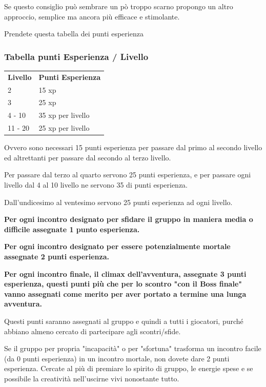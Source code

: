 \documentclass[a4paper,11pt,twoside,openany]{book}
\begin{document}
Se questo consiglio può sembrare un pò troppo scarno propongo un altro approccio, semplice ma ancora più efficace e stimolante.

Prendete questa tabella dei punti esperienza

\subsubsection{Tabella punti Esperienza / Livello}

\label{tabella-punti-esperienza-livello}

\begin{tabular}{ll}
	\toprule
	\textbf{Livello} & \textbf{Punti Esperienza}\tabularnewline
	2                & 15 xp\tabularnewline
	3                & 25 xp\tabularnewline
	4 - 10           & 35 xp per livello\tabularnewline
	11 - 20          & 25 xp per livello\tabularnewline
\end{tabular}

\bigskip

Ovvero sono necessari 15 punti esperienza per passare dal primo al secondo livello ed altrettanti per passare dal secondo al terzo livello.

Per passare dal terzo al quarto servono 25 punti esperienza, e per passare ogni livello dal 4 al 10 livello ne servono 35 di punti esperienza.

Dall'undicesimo al ventesimo servono 25 punti esperienza ad ogni livello.

\textbf{Per ogni incontro designato per sfidare il gruppo in maniera media o difficile assegnate 1 punto esperienza.}

\textbf{Per ogni incontro designato per essere potenzialmente mortale assegnate 2 punti esperienza.}

\textbf{Per ogni incontro finale, il climax dell'avventura, assegnate 3 punti esperienza, questi punti più che per lo scontro "con il Boss finale" vanno assegnati come merito per aver portato a termine una lunga avventura.}

Questi punti saranno assegnati al gruppo e quindi a tutti i giocatori, purché abbiano almeno cercato di partecipare agli scontri/sfide.

Se il gruppo per propria "incapacità" o per "sfortuna" trasforma un incontro facile (da 0 punti esperienza) in un incontro mortale, non dovete dare 2 punti esperienza. Cercate al più di premiare lo spirito di gruppo, le energie spese e se possibile la creatività nell'uscirne vivi  nonostante tutto.
\end{document}

